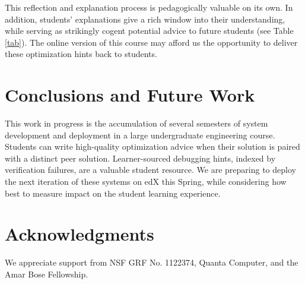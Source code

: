 \documentclass{chi-ext}
\begin{document}

This reflection and explanation process is pedagogically valuable on its own. In addition, students' explanations give a rich window into their understanding, while serving as strikingly cogent potential advice to future students (see Table \ref{tab}). The online version of this course may afford us the opportunity to deliver these optimization hints back to students.

\section{Conclusions and Future Work}

This work in progress is the accumulation of several semesters of system development and deployment in a large undergraduate engineering course. Students can write high-quality optimization advice when their solution is paired with a distinct peer solution. Learner-sourced debugging hints, indexed by verification failures, are a valuable student resource. We are preparing to deploy the next iteration of these systems on edX this Spring, while considering how best to measure impact on the student learning experience.

\section{Acknowledgments}

We appreciate support from NSF GRF No. 1122374, Quanta Computer, and the Amar Bose Fellowship.





\balance
\end{document}
